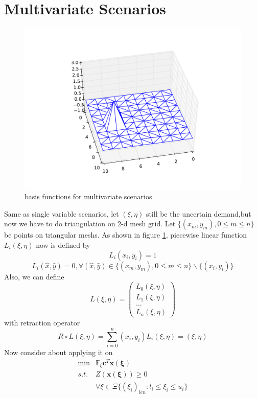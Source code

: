\documentclass{article}
\begin{document}
\section{Multivariate Scenarios}
\begin{figure}
\centering
\includegraphics[width=\textwidth]{basis_3.pdf}
\caption{basis functions for multivariate scenarios}\label{multi}
\end{figure}
Same as single variable scenarios, let $(\xi,\eta)$ still be the uncertain demand,but now we have to do triangulation on 2-d mesh grid. Let $\{(x_m,y_m),0 \leq m \leq n\} $ be points on triangular meshs. As shown in figure \ref{multi}, piecewise linear function $L_i(\xi,\eta)$ now is defined by
$$
L_i(x_i,y_i) = 1
$$
$$
L_i(\hat{x},\hat{y}) = 0 ,\forall (\hat{x},\hat{y}) \in \{(x_m,y_m),0 \leq m \leq n\}\backslash \{(x_i,y_i)\}
$$
Also, we can define
$$
L(\xi,\eta) =
\left(
\begin{array}{c}
L_0(\xi,\eta)\\
L_1(\xi,\eta)\\
\ldots\\
L_n(\xi,\eta)
\end{array}
\right)
$$
with retraction operator
$$
R\circ L(\xi,\eta) = \sum\limits_{i=0}^{n} (x_i,y_i) L_i(\xi,\eta) = (\xi,\eta)
$$
Now consider about applying it on
$$
\begin{array}{ll}
\min & \mathbb{E_\xi}\mathbf{c}^T \mathbf{x(\xi)}\\
s.t. & Z(\mathbf{x(\xi)}) \geq 0 \\
& \forall \xi \in \Xi \{(\xi_i)_{len}:l_i \leq \xi_i \leq u_i \}
\end{array}
$$
\end{document}
